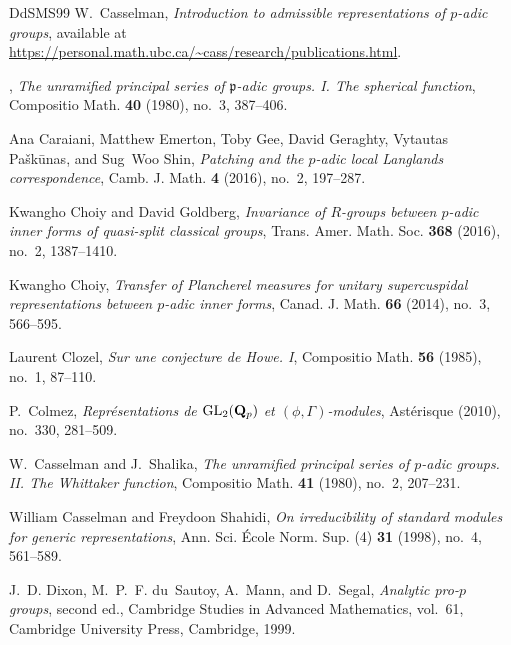 \documentclass[a4paper]{amsart}
\numberwithin{equation}{section}
\theoremstyle{remark}
\theoremstyle{definition}
\begin{document}
\begin{thebibliography}{DdSMS99}
W.~Casselman, \emph{Introduction to admissible representations of $p$-adic
  groups}, available at
  \url{https://personal.math.ubc.ca/~cass/research/publications.html}.

\bysame, \emph{The unramified principal series of {${\mathfrak p}$}-adic
  groups. {I}. {T}he spherical function}, Compositio Math. \textbf{40} (1980),
  no.~3, 387--406. 

Ana Caraiani, Matthew Emerton, Toby Gee, David Geraghty, Vytautas
  Pa\v{s}k\={u}nas, and Sug~Woo Shin, \emph{Patching and the {$p$}-adic local
  {L}anglands correspondence}, Camb. J. Math. \textbf{4} (2016), no.~2,
  197--287. 

Kwangho Choiy and David Goldberg, \emph{Invariance of {$R$}-groups between
  {$p$}-adic inner forms of quasi-split classical groups}, Trans. Amer. Math.
  Soc. \textbf{368} (2016), no.~2, 1387--1410. 

Kwangho Choiy, \emph{Transfer of {P}lancherel measures for unitary
  supercuspidal representations between {$p$}-adic inner forms}, Canad. J.
  Math. \textbf{66} (2014), no.~3, 566--595. 

Laurent Clozel, \emph{Sur une conjecture de {H}owe. {I}}, Compositio Math.
  \textbf{56} (1985), no.~1, 87--110. 

P.~Colmez, \emph{Repr\'esentations de {${\rm GL}\sb 2(\bold Q\sb p)$} et
  {$(\phi,\Gamma)$}-modules}, Ast\'erisque (2010), no.~330, 281--509.

W.~Casselman and J.~Shalika, \emph{The unramified principal series of
  {$p$}-adic groups. {II}. {T}he {W}hittaker function}, Compositio Math.
  \textbf{41} (1980), no.~2, 207--231. 

William Casselman and Freydoon Shahidi, \emph{On irreducibility of standard
  modules for generic representations}, Ann. Sci. \'{E}cole Norm. Sup. (4)
  \textbf{31} (1998), no.~4, 561--589. 

J.~D. Dixon, M.~P.~F. du~Sautoy, A.~Mann, and D.~Segal, \emph{Analytic
  pro-{$p$} groups}, second ed., Cambridge Studies in Advanced Mathematics,
  vol.~61, Cambridge University Press, Cambridge, 1999. 


\end{thebibliography}
\end{document}
